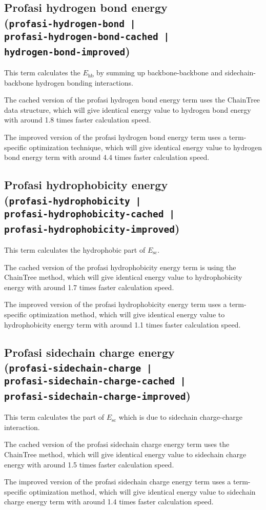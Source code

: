 \subsection{Profasi hydrogen bond energy \\(\texttt{profasi-hydrogen-bond~|}\\\texttt{profasi-hydrogen-bond-cached~|}\\\texttt{hydrogen-bond-improved})}

This term calculates the $E_{\mathrm{hb}}$ by summing up
backbone-backbone and side\-chain-back\-bone hydrogen bonding
interactions.

The cached version of the profasi hydrogen bond energy term uses the
ChainTree data structure, which will give identical energy value to
hydrogen bond energy with around 1.8 times faster calculation speed.

The improved version of the profasi hydrogen bond energy term uses a
term-specific optimization technique, which will give identical energy
value to hydrogen bond energy term with around 4.4 times faster
calculation speed.
 
\subsection{Profasi hydrophobicity energy \\(\texttt{profasi-hydrophobicity~|}\\\texttt{profasi-hydrophobicity-cached~|}\\\texttt{profasi-hydrophobicity-improved})}
This term calculates the hydrophobic part of $E_{\mathrm{sc}}$.

The cached version of the profasi hydrophobicity energy term is using
the ChainTree method, which will give identical energy value to
hydrophobicity energy with around 1.7 times faster calculation speed.

The improved version of the profasi hydrophobicity energy term uses a
term-specific optimization method, which will give identical energy
value to hydrophobicity energy term with around 1.1 times faster
calculation speed.

\subsection{Profasi sidechain charge energy \\(\texttt{profasi-sidechain-charge~|}\\\texttt{profasi-sidechain-charge-cached~|}\\\texttt{profasi-sidechain-charge-improved})}
This term calculates the part of $E_{\mathrm{sc}}$ which is due to
sidechain charge-charge interaction.
 
The cached version of the profasi sidechain charge energy term uses
the ChainTree method, which will give identical energy value to
sidechain charge energy with around 1.5 times faster calculation
speed.

The improved version of the profasi sidechain charge energy term uses
a term-specific optimization method, which will give identical energy
value to sidechain charge energy term with around 1.4 times faster
calculation speed.




